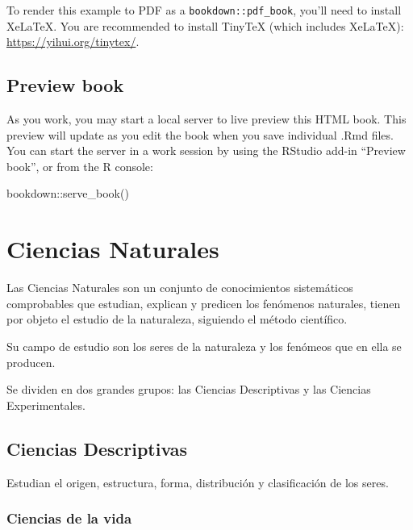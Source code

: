 \documentclass[
]{book}
\newenvironment{Shaded}{\begin{snugshade}}{\end{snugshade}}
\newcommand{\FunctionTok}[1]{\textcolor[rgb]{0.00,0.00,0.00}{#1}}
\newcommand{\NormalTok}[1]{#1}
\newcommand{\SpecialCharTok}[1]{\textcolor[rgb]{0.00,0.00,0.00}{#1}}
\theoremstyle{definition}
\theoremstyle{definition}
\theoremstyle{definition}
\theoremstyle{definition}
\theoremstyle{remark}
\begin{document}
To render this example to PDF as a \texttt{bookdown::pdf\_book}, you'll need to install XeLaTeX. You are recommended to install TinyTeX (which includes XeLaTeX): \url{https://yihui.org/tinytex/}.

\hypertarget{preview-book}{%
\section{Preview book}\label{preview-book}}

As you work, you may start a local server to live preview this HTML book. This preview will update as you edit the book when you save individual .Rmd files. You can start the server in a work session by using the RStudio add-in ``Preview book'', or from the R console:

\begin{Shaded}
\begin{Highlighting}[]
\NormalTok{bookdown}\SpecialCharTok{::}\FunctionTok{serve\_book}\NormalTok{()}
\end{Highlighting}
\end{Shaded}

\hypertarget{ciencias-naturales}{%
\chapter{Ciencias Naturales}\label{ciencias-naturales}}

Las Ciencias Naturales son un conjunto de conocimientos sistemáticos comprobables que estudian, explican y predicen los fenómenos naturales, tienen por objeto el estudio de la naturaleza, siguiendo el método científico.

Su campo de estudio son los seres de la naturaleza y los fenómeos que en ella se producen.

Se dividen en dos grandes grupos: las Ciencias Descriptivas y las Ciencias Experimentales.

\hypertarget{ciencias-descriptivas}{%
\section{Ciencias Descriptivas}\label{ciencias-descriptivas}}

Estudian el origen, estructura, forma, distribución y clasificación de los seres.

\hypertarget{ciencias-de-la-vida}{%
\subsection{Ciencias de la vida}\label{ciencias-de-la-vida}}
\end{document}
